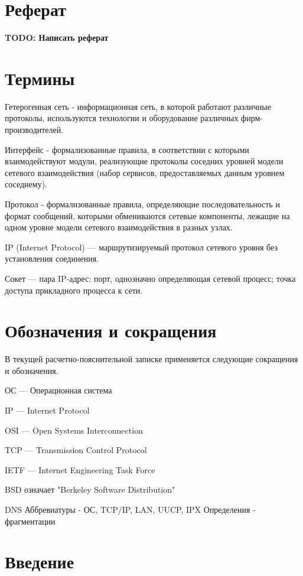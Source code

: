 \chapter*{Реферат}

\textbf{TODO: Написать реферат}

\chapter*{Термины}
Гетерогенная сеть - информационная сеть, в которой работают различные протоколы, используются технологии и оборудование различных фирм-производителей.

Интерфейс - формализованные правила, в соответствии с которыми взаимодействуют модули, реализующие протоколы соседних уровней модели сетевого взаимодействия (набор сервисов, предоставляемых данным уровнем соседнему).

Протокол - формализованные правила, определяющие последовательность и формат сообщений, которыми обмениваются сетевые компоненты, лежащие на одном уровне модели сетевого взаимодействия в разных узлах.

IP (Internet Protocol) — маршрутизируемый протокол сетевого уровня без установления соединения.

Сокет — пара IP-адрес: порт, однозначно определяющая сетевой процесс; точка доступа прикладного процесса к сети.

\chapter*{Обозначения и сокращения}

В текущей расчетно-пояснительной записке применяется следующие сокращения и обозначения.

ОС --- Операционная система

IP ---  Internet Protocol 

OSI --- Open Systems Interconnection 

TCP --- Transmission Control Protocol

IETF --- Internet Engineering Task Force

BSD означает "Berkeley Software Distribution"

DNS
Аббревиатуры - ОС, TCP/IP, LAN, UUCP, IPX
Определения - фрагментации

\chapter*{Введение}

